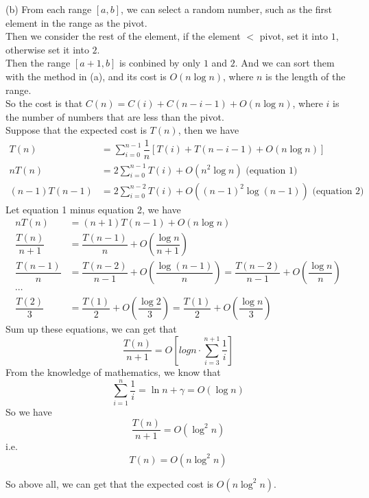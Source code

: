 (b) From each range $[a,b]$, we can select a random number, such as the first element in the range as the pivot.\\
Then we consider the rest of the element, if the element $<$ pivot, set it into $1$, otherwise set it into $2$.\\
Then the range $[a+1,b]$ is conbined by only $1$ and $2$. And we can sort them with the method in (a), and its cost is $O(n\log n)$, where $n$ is the length of the range.\\
So the cost is that $C(n)=C(i)+C(n-i-1)+O(n\log n)$, where $i$ is the number of numbers that are less than the pivot.\\
Suppose that the expected cost is $T(n)$, then we have
\begin{align*}
    T(n)  &= \sum_{i=0}^{n-1}\dfrac{1}{n}[T(i)+T(n-i-1)+O(n\log n)] \\
    nT(n) &= 2\sum_{i=0}^{n-1}T(i) + O(n^2\log n)            \text{\ \ \ \ \ \ \ \ \ \ \ \ \ \ \ \ \ (equation 1)} \\
    (n-1)T(n-1) &= 2\sum_{i=0}^{n-2}T(i) + O((n-1)^2\log (n-1))      \text{\ \ \ (equation 2)}
\end{align*}
Let equation 1 minus equation 2, we have
\begin{align*}
    nT(n) &= (n+1)T(n-1) + O(n\log n)\\
    \dfrac{T(n)}{n+1} &= \dfrac{T(n-1)}{n} + O(\dfrac{\log n}{n+1})\\
    \dfrac{T(n-1)}{n} &= \dfrac{T(n-2)}{n-1} + O(\dfrac{\log (n-1)}{n}) = \dfrac{T(n-2)}{n-1} + O(\dfrac{\log n}{n})\\
    \cdots\\
    \dfrac{T(2)}{3} &= \dfrac{T(1)}{2} + O(\dfrac{\log 2}{3}) = \dfrac{T(1)}{2} + O(\dfrac{\log n}{3})
\end{align*}
Sum up these equations, we can get that
$$\dfrac{T(n)}{n+1}=O\left[logn\cdot \sum_{i=3}^{n+1}\dfrac{1}{i}\right]$$
From the knowledge of mathematics, we know that
$$\sum_{i=1}^{n}\dfrac{1}{i}=\ln n + \gamma = O(\log n)$$
So we have 
$$\dfrac{T(n)}{n+1}=O(\log^2n)$$
i.e.
$$T(n)=O(n\log^2n)$$

So above all, we can get that the expected cost is $O(n\log^2n)$.

\newpage
